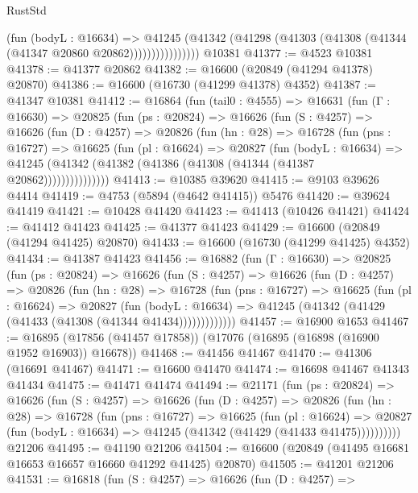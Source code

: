 \begin{lexlean}{RustStd}
\begin{coremodule}
{\begin{coremodule}
{{{{{{{{{{{{{{{{{{{{{{{{{{{{{{{{{{{{{{{{{{{{{{{{{{{{{{{                      (fun (bodyL : @16634) =>
                      @41245
                        (@41342
                          (@41298 (@41303 (@41308 (@41344 (@41347 @20860 @20862))))))))))))))))
    @10381
@41377 := @4523 @10381
@41378 := @41377 @20862
@41382 := @16600 (@20849 (@41294 @41378) @20870)
@41386 := @16600 (@16730 (@41299 @41378) @4352)
@41387 := @41347 @10381
@41412 := @16864
    (fun (tail0 : @4555) =>
    @16631
      (fun (Γ : @16630) =>
      @20825
        (fun (ps : @20824) =>
        @16626
          (fun (S : @4257) =>
          @16626
            (fun (D : @4257) =>
            @20826
              (fun (hn : @28) =>
              @16728
                (fun (pns : @16727) =>
                @16625
                  (fun (pl : @16624) =>
                  @20827
                    (fun (bodyL : @16634) =>
                    @41245 (@41342 (@41382 (@41386 (@41308 (@41344 (@41387 @20862)))))))))))))))
@41413 := @10385 @39620
@41415 := @9103 @39626 @4414
@41419 := @4753 (@5894 (@4642 @41415)) @5476
@41420 := @39624 @41419
@41421 := @10428 @41420
@41423 := @41413 (@10426 @41421)
@41424 := @41412 @41423
@41425 := @41377 @41423
@41429 := @16600 (@20849 (@41294 @41425) @20870)
@41433 := @16600 (@16730 (@41299 @41425) @4352)
@41434 := @41387 @41423
@41456 := @16882
    (fun (Γ : @16630) =>
    @20825
      (fun (ps : @20824) =>
      @16626
        (fun (S : @4257) =>
        @16626
          (fun (D : @4257) =>
          @20826
            (fun (hn : @28) =>
            @16728
              (fun (pns : @16727) =>
              @16625
                (fun (pl : @16624) =>
                @20827
                  (fun (bodyL : @16634) =>
                  @41245 (@41342 (@41429 (@41433 (@41308 (@41344 @41434)))))))))))))
@41457 := @16900 @1653
@41467 := @16895 (@17856 (@41457 @17858)) (@17076 (@16895 (@16898 (@16900 @1952 @16903)) @16678))
@41468 := @41456 @41467
@41470 := @41306 (@16691 @41467)
@41471 := @16600 @41470
@41474 := @16698 @41467 @41343 @41434
@41475 := @41471 @41474
@41494 := @21171
    (fun (ps : @20824) =>
    @16626
      (fun (S : @4257) =>
      @16626
        (fun (D : @4257) =>
        @20826
          (fun (hn : @28) =>
          @16728
            (fun (pns : @16727) =>
            @16625
              (fun (pl : @16624) =>
              @20827 (fun (bodyL : @16634) => @41245 (@41342 (@41429 (@41433 @41475))))))))))
    @21206
@41495 := @41190 @21206
@41504 := @16600 (@20849 (@41495 @16681 @16653 @16657 @16660 @41292 @41425) @20870)
@41505 := @41201 @21206
@41531 := @16818
    (fun (S : @4257) =>
    @16626
      (fun (D : @4257) =>
}}}}}}}}}}}}}}}}}}}}}}}}}}}}}}}}}}}}}}}}}}}}}}}}}}}}}}}
\end{coremodule}}
\end{coremodule}
\end{lexlean}

